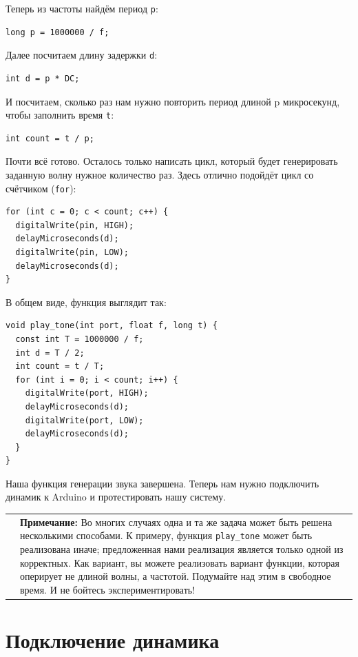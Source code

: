 \documentclass[a4paper,twoside]{book}
\newcommand{\note}[1]{
  \vspace{8pt}
  \begin{tabularx}{\textwidth}{m{1cm} m{9cm}}
    
    & \textbf{Примечание:} #1 \\
  \end{tabularx}
}
\begin{document}
Теперь из частоты найдём период \texttt{p}:
\begin{verbatim}
long p = 1000000 / f;
\end{verbatim}

Далее посчитаем длину задержки \texttt{d}:
\begin{verbatim}
int d = p * DC;
\end{verbatim}

И посчитаем, сколько раз нам нужно повторить период длиной p микросекунд, чтобы
заполнить время \texttt{t}:
\begin{verbatim}
int count = t / p;
\end{verbatim}

Почти всё готово. Осталось только написать цикл, который будет генерировать
заданную волну нужное количество раз. Здесь отлично подойдёт цикл со счётчиком
(\texttt{for}):

\begin{verbatim}
for (int c = 0; c < count; c++) {
  digitalWrite(pin, HIGH);
  delayMicroseconds(d);
  digitalWrite(pin, LOW);
  delayMicroseconds(d);
}
\end{verbatim}

В общем виде, функция выглядит так:

\begin{verbatim}
void play_tone(int port, float f, long t) {
  const int T = 1000000 / f;
  int d = T / 2;
  int count = t / T;
  for (int i = 0; i < count; i++) {
    digitalWrite(port, HIGH);
    delayMicroseconds(d);
    digitalWrite(port, LOW);
    delayMicroseconds(d);
  }
}
\end{verbatim}

Наша функция генерации звука завершена. Теперь нам нужно подключить динамик к
Arduino и протестировать нашу систему.

\note{Во многих случаях одна и та же задача может быть решена несколькими
  способами. К примеру, функция \texttt{play\_tone} может быть реализована
  иначе; предложенная нами реализация является только одной из корректных. Как
  вариант, вы можете реализовать вариант функции, которая оперирует не длиной
  волны, а частотой. Подумайте над этим в свободное время. И не бойтесь
  экспериментировать! }

\section{Подключение динамика}
\end{document}
